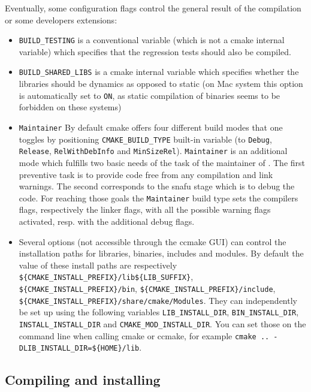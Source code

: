 Eventually, some configuration flags control the general result of the
compilation or some developers extensions:
\begin{itemize}
\item
  \verb+BUILD_TESTING+ is a conventional variable (which is not a cmake
  internal variable) which specifies that the regression tests should also be
  compiled.

\item
  \verb+BUILD_SHARED_LIBS+ is a cmake internal variable which
  specifies whether the libraries should be dynamics as opposed to
  static (on Mac system this option is automatically set to \verb!ON!,
  as static compilation of binaries seems to be forbidden on these
  systems)

\item
  \verb+Maintainer+ By default cmake offers four different build modes
  that one toggles by positioning \verb+CMAKE_BUILD_TYPE+ built-in
  variable (to \verb+Debug+, \verb+Release+, \verb+RelWithDebInfo+ and
  \verb+MinSizeRel+). \verb+Maintainer+ is an additional mode which
  fulfills two basic needs of the task of the maintainer of \diet. The
  first preventive task is to provide code free from any compilation
  and link warnings. The second corresponds to the snafu stage which
  is to debug the code. For reaching those goals the \verb+Maintainer+
  build type sets the compilers flags, respectively the linker flags,
  with all the possible warning flags activated, resp. with the
  additional debug flags.

\item
  Several options (not accessible through the ccmake GUI) can control the
  installation paths for libraries, binaries, includes and modules. By default
  the value of these install paths are respectively
  \verb+${CMAKE_INSTALL_PREFIX}/lib${LIB_SUFFIX}+,
  \verb+${CMAKE_INSTALL_PREFIX}/bin+, \verb+${CMAKE_INSTALL_PREFIX}/include+,
  \verb+${CMAKE_INSTALL_PREFIX}/share/cmake/Modules+. They can independently be
  set up using the following variables \verb+LIB_INSTALL_DIR+,
  \verb+BIN_INSTALL_DIR+, \verb+INSTALL_INSTALL_DIR+ and
  \verb+CMAKE_MOD_INSTALL_DIR+. You can set those on the command line when
  calling cmake or ccmake, for example \verb+cmake .. -DLIB_INSTALL_DIR=${HOME}/lib+.
\end{itemize}

\subsection{Compiling and installing}

